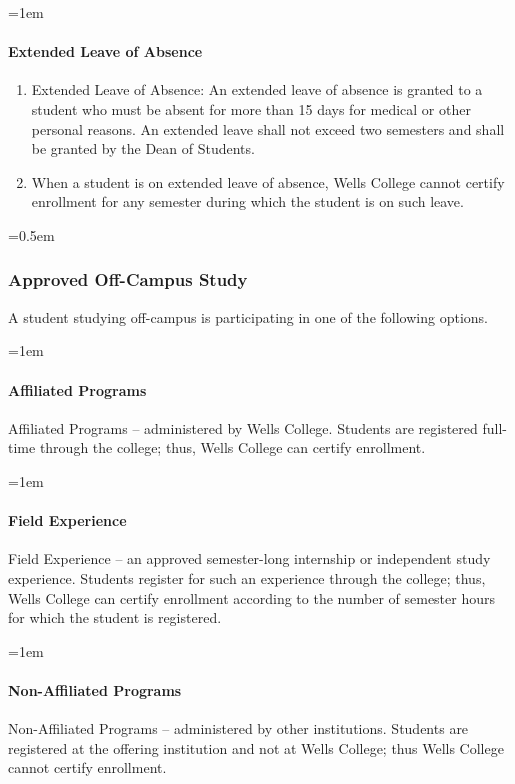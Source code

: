 \documentclass{manual}
\newcommand{\oldbreak}[1]{}
\let\oldsubsubsection\subsubsection
\renewcommand\subsubsection{\leftskip=0.5em\oldsubsubsection}
\let\oldparagraph\paragraph
\renewcommand\paragraph{\leftskip=1em\oldparagraph}
\newcommand{\editRemove}[1]{}
\newcommand{\them}{(pronoun)~ }
\begin{document}
\oldbreak{IX-1}

\paragraph{Extended Leave of Absence}

\begin{enumerate}[label=\alph*)]
\item Extended Leave of Absence: An extended leave of absence is granted to a student who must be absent for more than 15 days for medical or other personal reasons. An extended leave shall not exceed two semesters and shall be granted by the Dean of Students. 
\item When a student is on extended leave of absence, Wells College cannot certify enrollment for \editRemove{\them for} any semester during which the student is on such leave.
\end{enumerate}

\subsubsection{Approved Off-Campus Study}

A student studying off-campus is participating in one of the following options.

\paragraph{Affiliated Programs}
Affiliated Programs -- administered by Wells College. Students are registered full-time through the college; thus, Wells College can certify enrollment.

\paragraph{Field Experience}
Field Experience -- an approved semester-long internship or independent study experience. Students register for such an experience through the college; thus, Wells College can certify enrollment according to the number of semester hours for which the student is registered.

\paragraph{Non-Affiliated Programs}
Non-Affiliated Programs -- administered by other institutions. Students are registered at the offering institution and not at Wells College; thus Wells College cannot certify enrollment.
\end{document}

